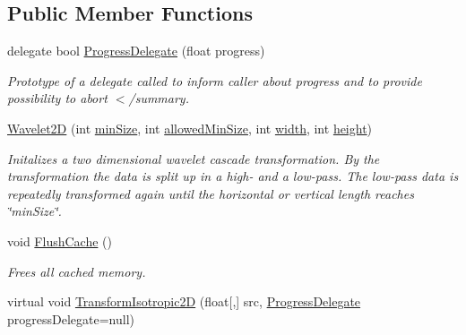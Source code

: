 \subsection*{\-Public \-Member \-Functions}
\begin{DoxyCompactItemize}
\item 
\hypertarget{class_turbo_wavelets_1_1_wavelet2_d_aec52fe74aa08e073119064ef4ac3fe93}{delegate bool \hyperlink{class_turbo_wavelets_1_1_wavelet2_d_aec52fe74aa08e073119064ef4ac3fe93}{\-Progress\-Delegate} (float progress)}\label{class_turbo_wavelets_1_1_wavelet2_d_aec52fe74aa08e073119064ef4ac3fe93}

\begin{DoxyCompactList}\small\item\em \-Prototype of a delegate called to inform caller about progress and to provide possibility to abort $<$/summary. \end{DoxyCompactList}\item 
\hyperlink{class_turbo_wavelets_1_1_wavelet2_d_a5156da3a3376121d64967dd8cd75725b}{\-Wavelet2\-D} (int \hyperlink{class_turbo_wavelets_1_1_wavelet2_d_af5148ef1a46dd5694ccea13aa8f1b9e2}{min\-Size}, int \hyperlink{class_turbo_wavelets_1_1_wavelet2_d_a949bac2b4f540092cf7cc8916968cdc0}{allowed\-Min\-Size}, int \hyperlink{class_turbo_wavelets_1_1_wavelet2_d_aaa4b3711957fe1798980e6891331a08d}{width}, int \hyperlink{class_turbo_wavelets_1_1_wavelet2_d_afb2aa87b89b82f329357cbdc0cde18a8}{height})
\begin{DoxyCompactList}\small\item\em \-Initalizes a two dimensional wavelet cascade transformation. \-By the transformation the data is split up in a high-\/ and a low-\/pass. \-The low-\/pass data is repeatedly transformed again until the horizontal or vertical length reaches \char`\"{}min\-Size\char`\"{}. \end{DoxyCompactList}\item 
void \hyperlink{class_turbo_wavelets_1_1_wavelet2_d_a727e557f207cf861b10c38f1f1a91b52}{\-Flush\-Cache} ()
\begin{DoxyCompactList}\small\item\em \-Frees all cached memory. \end{DoxyCompactList}\item 
virtual void \hyperlink{class_turbo_wavelets_1_1_wavelet2_d_ac647a989c2b66ca08a8b7e4196cbc547}{\-Transform\-Isotropic2\-D} (float\mbox{[},\mbox{]} src, \hyperlink{class_turbo_wavelets_1_1_wavelet2_d_aec52fe74aa08e073119064ef4ac3fe93}{\-Progress\-Delegate} progress\-Delegate=null)

\end{DoxyCompactItemize}
